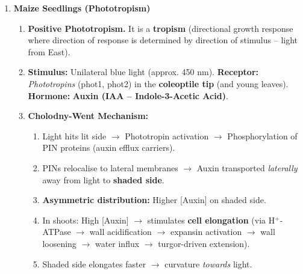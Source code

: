 \documentclass[11pt]{article}
\begin{document}
\begin{enumerate}
    \item \textbf{Maize Seedlings (Phototropism)}
    \begin{enumerate}
        \item \textbf{Positive Phototropism.} It is a \textbf{tropism} (directional growth response where direction of response is determined by direction of stimulus -- light from East).
        \item \textbf{Stimulus:} Unilateral blue light (approx. 450 nm). \textbf{Receptor:} \emph{Phototropins} (phot1, phot2) in the \textbf{coleoptile tip} (and young leaves). \textbf{Hormone:} \textbf{Auxin (IAA -- Indole-3-Acetic Acid)}.
        \item \textbf{Cholodny-Went Mechanism:}
        \begin{enumerate}
            \item Light hits lit side $\rightarrow$ Phototropin activation $\rightarrow$ Phosphorylation of PIN proteins (auxin efflux carriers).
            \item PINs relocalise to lateral membranes $\rightarrow$ Auxin transported \emph{laterally} away from light to \textbf{shaded side}.
            \item \textbf{Asymmetric distribution:} Higher [Auxin] on shaded side.
            \item In shoots: High [Auxin] $\rightarrow$ stimulates \textbf{cell elongation} (via H$^+$-ATPase $\rightarrow$ wall acidification $\rightarrow$ expansin activation $\rightarrow$ wall loosening $\rightarrow$ water influx $\rightarrow$ turgor-driven extension).
            \item Shaded side elongates faster $\rightarrow$ curvature \emph{towards} light.
        \end{enumerate}
    \end{enumerate}


\end{enumerate}
\end{document}
